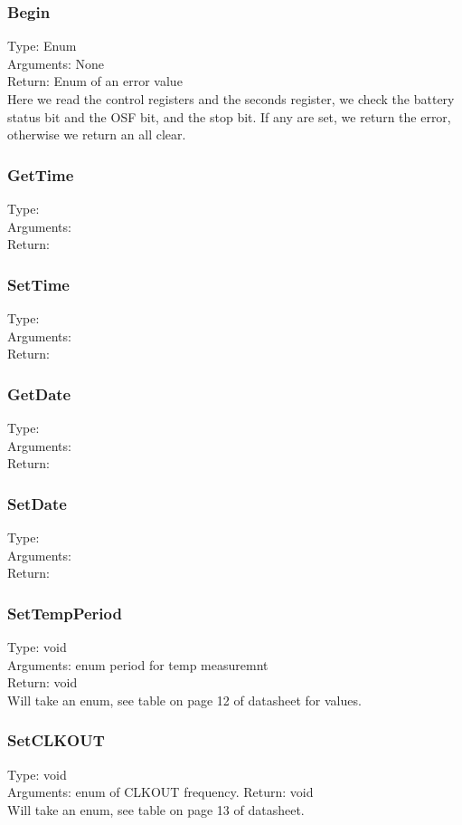\documentclass[letterpaper,11pt]{article}
\begin{document}
		\subsubsection{Begin}
		Type: Enum\\
		Arguments: None\\
		Return: Enum of an error value\\
		Here we read the control registers and the seconds register, we check the battery status bit and the OSF bit, and the stop bit. If any are set, we return the error, otherwise we return an all clear.
		\subsubsection{GetTime}
		Type: \\
		Arguments: \\
		Return:\\
		\subsubsection{SetTime}
		Type: \\
		Arguments: \\
		Return:\\
		\subsubsection{GetDate}
		Type: \\
		Arguments: \\
		Return:\\
		\subsubsection{SetDate}
		Type: \\
		Arguments: \\
		Return:\\
		\subsubsection{SetTempPeriod}
		Type: void\\
		Arguments: enum period for temp measuremnt\\
		Return: void\\
		Will take an enum, see table on page 12 of datasheet for values.
		\subsubsection{SetCLKOUT}
		Type: void\\
		Arguments: enum of CLKOUT frequency.
		Return: void\\
		Will take an enum, see table on page 13 of datasheet.
\end{document}

